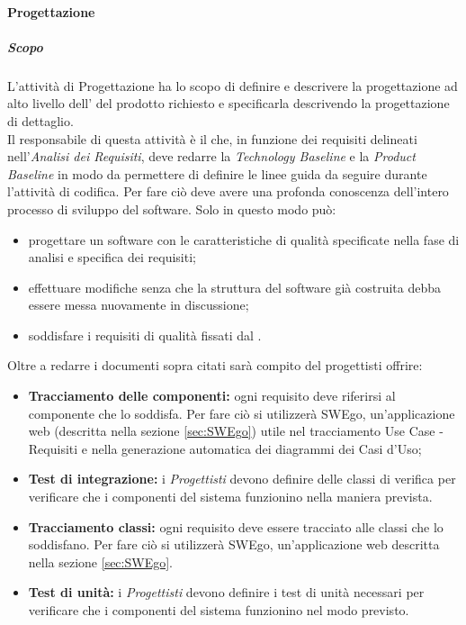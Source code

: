 		\paragraph{Progettazione}
			\subparagraph{Scopo}
			\Spazio
			L'attività di Progettazione ha lo scopo di definire e descrivere la progettazione ad alto livello dell' del prodotto richiesto e specificarla descrivendo la progettazione di dettaglio. \\
			Il responsabile di questa attività è il \emph{} che, in funzione dei requisiti delineati nell'\textit{Analisi dei Requisiti}, deve redarre la \textit{Technology Baseline} e la \textit{Product Baseline} in modo da permettere di definire le linee guida da seguire durante l'attività di codifica.
			Per fare ciò deve avere una profonda conoscenza dell'intero processo di sviluppo del software.
			Solo in questo modo può:
			\begin{itemize}
				\item progettare un software con le caratteristiche di qualità specificate nella fase di analisi e specifica dei requisiti;
				\item effettuare modifiche senza che la struttura del software già costruita debba essere messa nuovamente in discussione;
				\item soddisfare i requisiti di qualità fissati dal .
			\end{itemize}
			Oltre a redarre i documenti sopra citati sarà compito del progettisti offrire:
			\begin{itemize}
				\item \textbf{Tracciamento delle componenti:}
				ogni requisito deve riferirsi al componente che lo soddisfa. Per fare ciò si utilizzerà SWEgo, un'applicazione web (descritta nella sezione \ref{sec:SWEgo}) utile nel tracciamento Use Case - Requisiti e nella generazione automatica dei diagrammi dei Casi d'Uso;
				\item \textbf{Test di integrazione:}
				i \emph{Progettisti} devono definire delle classi di verifica per verificare che i componenti del sistema funzionino nella maniera prevista.	
				\item \textbf{Tracciamento classi:}
				ogni requisito deve essere tracciato alle classi che lo soddisfano. Per fare ciò si utilizzerà SWEgo, un'applicazione web descritta nella sezione \ref{sec:SWEgo}.
				\item \textbf{Test di unità:}
				i \emph{Progettisti} devono definire i test di unità necessari per verificare che i componenti del sistema funzionino nel modo previsto.
			\end{itemize}
		
